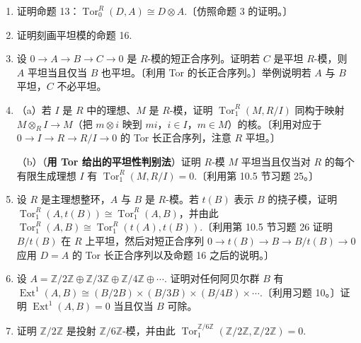 \begin{enumerate}
（d）证明（b）的逆：若内射 \(R\)-模的任意直和 \(\bigoplus_{j \in \mathcal{J}}Q_j\) 仍内射，则 \(R\) 是诺特环。〔若（c）中的直和是内射的，用 Baer 判别法把 \(f\) 提升为同态 \(F : R \to \bigoplus_{i=1,2,\ldots}Q_i\). 若 \(F(1)\) 在 \(Q_i\) 中的分量对 \(i \geq n\) 为 0，证明 \(I = I_n\)，即理想升链有限。〕

\item 证明命题 13：\(\operatorname{Tor}_0^R(D, A) \cong D \otimes A\).〔仿照命题 3 的证明。〕

\item 证明刻画平坦模的命题 16.

\item 设 \(0 \to A \to B \to C \to 0\) 是 \(R\)-模的短正合序列。证明若 \(C\) 是平坦 \(R\)-模，则 \(A\) 平坦当且仅当 \(B\) 也平坦。〔利用 Tor 的长正合序列。〕举例说明若 \(A\) 与 \(B\) 平坦，\(C\) 不必平坦。

\item （a）若 \(I\) 是 \(R\) 中的理想、\(M\) 是 \(R\)-模，证明 \(\operatorname{Tor}_1^R(M, R/I)\) 同构于映射 \(M \otimes_R I \to M\)（把 \(m \otimes i\) 映到 \(mi\)，\(i \in I\)，\(m \in M\)）的核。〔利用对应于 \(0 \to I \to R \to R/I \to 0\) 的 Tor 长正合序列，注意 \(R\) 平坦。〕

（b）（\textbf{用 Tor 给出的平坦性判别法}）证明 \(R\)-模 \(M\) 平坦当且仅当对 \(R\) 的每个有限生成理想 \(I\) 有 \(\operatorname{Tor}_1^R(M, R/I) = 0\).〔利用第 10.5 节习题 25。〕

\item 设 \(R\) 是主理想整环，\(A\) 与 \(B\) 是 \(R\)-模。若 \(t(B)\) 表示 \(B\) 的挠子模，证明 \(\operatorname{Tor}_1^R(A, t(B)) \cong \operatorname{Tor}_1^R(A, B)\)，并由此 \(\operatorname{Tor}_1^R(A, B) \cong \operatorname{Tor}_1^R(t(A), t(B))\).〔利用第 10.5 节习题 26 证明 \(B/t(B)\) 在 \(R\) 上平坦，然后对短正合序列 \(0 \to t(B) \to B \to B/t(B) \to 0\) 应用 \(D = A\) 的 Tor 长正合序列以及命题 16 之后的说明。〕

\item 设 \(A = \mathbb{Z}/2\mathbb{Z} \oplus \mathbb{Z}/3\mathbb{Z} \oplus \mathbb{Z}/4\mathbb{Z} \oplus \cdots\). 证明对任何阿贝尔群 \(B\) 有 \(\operatorname{Ext}^1(A, B) \cong (B/2B) \times (B/3B) \times (B/4B) \times \cdots\).〔利用习题 10。〕证明 \(\operatorname{Ext}^1(A, B) = 0\) 当且仅当 \(B\) 可除。

\item 证明 \(\mathbb{Z}/2\mathbb{Z}\) 是投射 \(\mathbb{Z}/6\mathbb{Z}\)-模，并由此 \(\operatorname{Tor}_1^{\mathbb{Z}/6\mathbb{Z}}(\mathbb{Z}/2\mathbb{Z}, \mathbb{Z}/2\mathbb{Z}) = 0\).


\end{enumerate}
